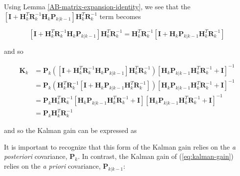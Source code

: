 Using Lemma \ref{AB-matrix-expansion-identity}, we see that the
$\left[ \mathbf{I} + \mathbf{H}_k^T \mathbf{R}_k^{-1} \mathbf{H}_k \mathbf{P}_{k|k-1} \right] \mathbf{H}_k^T \mathbf{R}_k^{-1}$
term becomes

\begin{equation*}
    \left[ \mathbf{I} + \mathbf{H}_k^T \mathbf{R}_k^{-1} \mathbf{H}_k \mathbf{P}_{k|k-1} \right] \mathbf{H}_k^T \mathbf{R}_k^{-1}
    = \mathbf{H}_k^T \mathbf{R}_k^{-1} \left[ \mathbf{I} + \mathbf{H}_k \mathbf{P}_{k|k-1} \mathbf{H}_k^T \mathbf{R}_k^{-1} \right]
\end{equation*}

and so

\begin{equation*}
    \begin{aligned}
        \mathbf{K}_k
        &= \mathbf{P}_k \left( \left[ \mathbf{I} + \mathbf{H}_k^T \mathbf{R}_k^{-1} \mathbf{H}_k \mathbf{P}_{k|k-1} \right]
        \mathbf{H}_k^T \mathbf{R}_k^{-1} \right) \left[ \mathbf{H}_k \mathbf{P}_{k|k-1} \mathbf{H}_k^T \mathbf{R}_k^{-1} + \mathbf{I} \right]^{-1} \\
        &= \mathbf{P}_k \left( \mathbf{H}_k^T \mathbf{R}_k^{-1} \left[ \mathbf{I} + \mathbf{H}_k \mathbf{P}_{k|k-1} \mathbf{H}_k^T \mathbf{R}_k^{-1} \right] \right)
        \left[ \mathbf{H}_k \mathbf{P}_{k|k-1} \mathbf{H}_k^T \mathbf{R}_k^{-1} + \mathbf{I} \right]^{-1} \\
        &= \mathbf{P}_k \mathbf{H}_k^T \mathbf{R}_k^{-1} \left[ \mathbf{H}_k \mathbf{P}_{k|k-1} \mathbf{H}_k^T \mathbf{R}_k^{-1} + \mathbf{I} \right]
        \left[ \mathbf{H}_k \mathbf{P}_{k|k-1} \mathbf{H}_k^T \mathbf{R}_k^{-1} + \mathbf{I} \right]^{-1} \\
        &= \mathbf{P}_k \mathbf{H}_k^T \mathbf{R}_k^{-1}
    \end{aligned}
\end{equation*}

and so the Kalman gain can be expressed as


It is important to recognize that this form of the Kalman gain relies on the
\textit{a posteriori} covariance, $\mathbf{P}_k$. In contrast, the Kalman gain of
(\ref{eq:kalman-gain}) relies on the \textit{a priori} covariance, $\mathbf{P}_{k|k-1}$:


